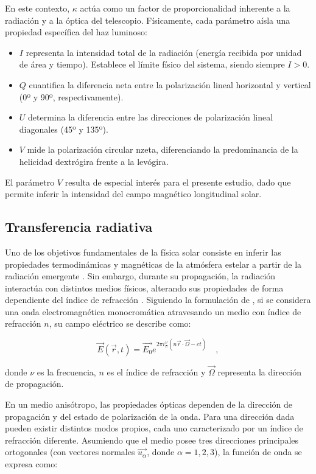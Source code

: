 En este contexto, $\kappa$ actúa como un factor de proporcionalidad inherente a la radiación y a la óptica del telescopio. Físicamente, cada parámetro aísla una propiedad específica del haz luminoso:

\begin{itemize}
    \item $I$ representa la intensidad total de la radiación (energía recibida por unidad de área y tiempo). Establece el límite físico del sistema, siendo siempre $I > 0$.
    \item $Q$ cuantifica la diferencia neta entre la polarización lineal horizontal y vertical (0º y 90º, respectivamente).
    \item $U$ determina la diferencia entre las direcciones de polarización lineal diagonales (45º y 135º).
    \item $V$ mide la polarización circular nzeta, diferenciando la predominancia de la helicidad dextrógira frente a la levógira.
\end{itemize}

El parámetro $V$ resulta de especial interés para el presente estudio, dado que permite inferir la intensidad del campo magnético longitudinal solar.

\subsection{Transferencia radiativa}
Uno de los objetivos fundamentales de la física solar consiste en inferir las propiedades termodinámicas y magnéticas de la atmósfera estelar a partir de la radiación emergente \cite{Rutten2003}. Sin embargo, durante su propagación, la radiación interactúa con distintos medios físicos, alterando sus propiedades de forma dependiente del índice de refracción \cite{chandrasekhar1960radiative}. Siguiendo la formulación de \cite{sanchezSolarObservationsTechniques1992}, si se considera una onda electromagnética monocromática atravesando un medio con índice de refracción $n$, su campo eléctrico se describe como:

\begin{equation}
    \label{eq:ondaElectro}
    \vec{E}(\vec{r}, t) = \vec{E_0} e^{2 \pi i \frac{\nu}{c}(n \vec{r} \cdot \vec{\Omega} - ct)} \quad,
\end{equation}

donde $\nu$ es la frecuencia, $n$ es el índice de refracción y $\vec{\Omega}$ representa la dirección de propagación. 

En un medio anisótropo, las propiedades ópticas dependen de la dirección de propagación y del estado de polarización de la onda. Para una dirección dada pueden existir distintos modos propios, cada uno caracterizado por un índice de refracción diferente. Asumiendo que el medio posee tres direcciones principales ortogonales (con vectores normales $\vec{u_\alpha}$, donde $\alpha = 1, 2, 3$), la función de onda se expresa como:

